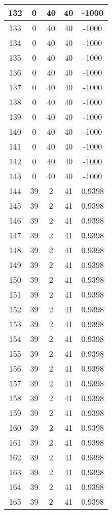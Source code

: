\documentclass[letterpaper, 12pt]{article}
\begin{document}
\begin{longtable}{|c|c|c|c|c|}
\hline
132 & 0 & 40 & 40 & -1000 \\
\hline
133 & 0 & 40 & 40 & -1000 \\
\hline
134 & 0 & 40 & 40 & -1000 \\
\hline
135 & 0 & 40 & 40 & -1000 \\
\hline
136 & 0 & 40 & 40 & -1000 \\
\hline
137 & 0 & 40 & 40 & -1000 \\
\hline
138 & 0 & 40 & 40 & -1000 \\
\hline
139 & 0 & 40 & 40 & -1000 \\
\hline
140 & 0 & 40 & 40 & -1000 \\
\hline
141 & 0 & 40 & 40 & -1000 \\
\hline
142 & 0 & 40 & 40 & -1000 \\
\hline
143 & 0 & 40 & 40 & -1000 \\
\hline
144 & 39 & 2 & 41 & 0.9398 \\
\hline
145 & 39 & 2 & 41 & 0.9398 \\
\hline
146 & 39 & 2 & 41 & 0.9398 \\
\hline
147 & 39 & 2 & 41 & 0.9398 \\
\hline
148 & 39 & 2 & 41 & 0.9398 \\
\hline
149 & 39 & 2 & 41 & 0.9398 \\
\hline
150 & 39 & 2 & 41 & 0.9398 \\
\hline
151 & 39 & 2 & 41 & 0.9398 \\
\hline
152 & 39 & 2 & 41 & 0.9398 \\
\hline
153 & 39 & 2 & 41 & 0.9398 \\
\hline
154 & 39 & 2 & 41 & 0.9398 \\
\hline
155 & 39 & 2 & 41 & 0.9398 \\
\hline
156 & 39 & 2 & 41 & 0.9398 \\
\hline
157 & 39 & 2 & 41 & 0.9398 \\
\hline
158 & 39 & 2 & 41 & 0.9398 \\
\hline
159 & 39 & 2 & 41 & 0.9398 \\
\hline
160 & 39 & 2 & 41 & 0.9398 \\
\hline
161 & 39 & 2 & 41 & 0.9398 \\
\hline
162 & 39 & 2 & 41 & 0.9398 \\
\hline
163 & 39 & 2 & 41 & 0.9398 \\
\hline
164 & 39 & 2 & 41 & 0.9398 \\
\hline
165 & 39 & 2 & 41 & 0.9398 \\

\end{longtable}
\end{document}
